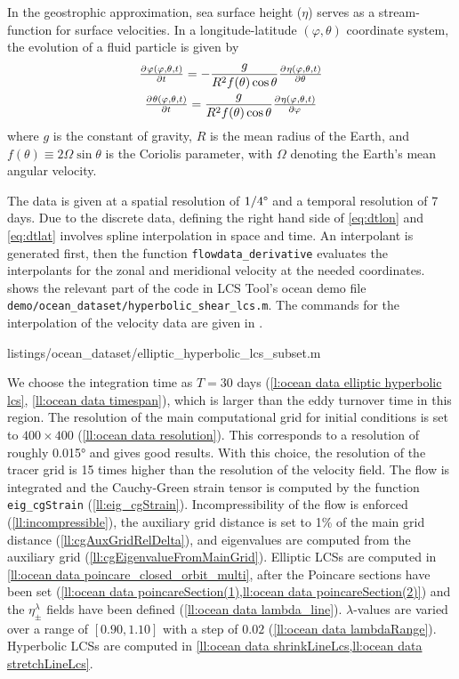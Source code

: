 \documentclass[5p]{elsarticle}
\begin{document}
In the geostrophic approximation, sea surface height ($\eta$) serves as a stream-function for surface velocities. In a longitude-latitude $(\varphi,\theta)$ coordinate system, the evolution of a fluid particle is given by
\begin{gather}
\pd{\varphi(\varphi,\theta,t)}{t} = -\frac{g}{R^2 f(\theta) \cos\theta} \pd{\eta(\varphi,\theta,t)}{\theta}\label{eq:dtlon}\\
\pd{\theta(\varphi,\theta,t)}{t} = \frac{g}{R^2 f(\theta) \cos\theta}\pd{\eta(\varphi,\theta,t)}{\varphi}
\label{eq:dtlat}
\end{gather}
where $g$ is the constant of gravity, $R$ is the mean radius of the Earth, and $f(\theta) \equiv 2\Omega\sin\theta$ is the Coriolis parameter, with $\Omega$ denoting the Earth's mean angular velocity.

The data is given at a spatial resolution of $1/4\degree$ and a temporal resolution of 7 days.
Due to the discrete data, defining the right hand side of \cref{eq:dtlon} and \cref{eq:dtlat} involves spline interpolation in space and time.
An interpolant is generated first, then the function \lstinline!flowdata_derivative! evaluates the interpolants for the zonal and meridional velocity at the needed coordinates.
 shows the relevant part of the code in LCS Tool's ocean demo file \lstinline!demo/ocean_dataset/hyperbolic_shear_lcs.m!.
The commands for the interpolation of the velocity data are given in .


        {listings/ocean_dataset/elliptic_hyperbolic_lcs_subset.m}

We choose the integration time as $T=30$ days (\cref{l:ocean data elliptic hyperbolic lcs}, \cref{ll:ocean data timespan}), which is larger than the eddy turnover time in this region. The resolution of the main computational grid for initial conditions is set to $400 \times 400$ (\cref{ll:ocean data resolution}). This corresponds to a resolution of roughly 0.015° and gives good results. With this choice, the resolution of the tracer grid is 15 times higher than the resolution of the velocity field. The flow is integrated and the Cauchy-Green strain tensor is computed by the function \lstinline!eig_cgStrain! (\cref{ll:eig_cgStrain}). Incompressibility of the flow is enforced (\cref{ll:incompressible}), the auxiliary grid distance is set to 1\% of the main grid distance (\cref{ll:cgAuxGridRelDelta}), and eigenvalues are computed from the auxiliary grid (\cref{ll:cgEigenvalueFromMainGrid}). Elliptic LCSs are computed in \cref{ll:ocean data poincare_closed_orbit_multi}, after the Poincare sections have been set (\cref{ll:ocean data poincareSection(1),ll:ocean data poincareSection(2)}) and the $\eta_\pm^\lambda$ fields have been defined (\cref{ll:ocean data lambda_line}). $\lambda$-values are varied over a range of $[0.90,1.10]$ with a step of $0.02$ (\cref{ll:ocean data lambdaRange}). Hyperbolic LCSs are computed in \cref{ll:ocean data shrinkLineLcs,ll:ocean data stretchLineLcs}.
\end{document}
